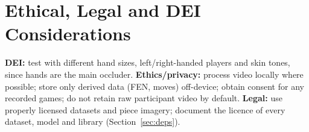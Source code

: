 \section{Ethical, Legal and DEI Considerations}\label{sec:ethics}
\textbf{DEI:} test with different hand sizes, left/right-handed players and skin tones, since hands are the main
occluder. \textbf{Ethics/privacy:} process video locally where possible; store only derived data (FEN, moves) off-device;
obtain consent for any recorded games; do not retain raw participant video by default. \textbf{Legal:} use properly
licensed datasets and piece imagery; document the licence of every dataset, model and library (Section~\ref{sec:deps}).
